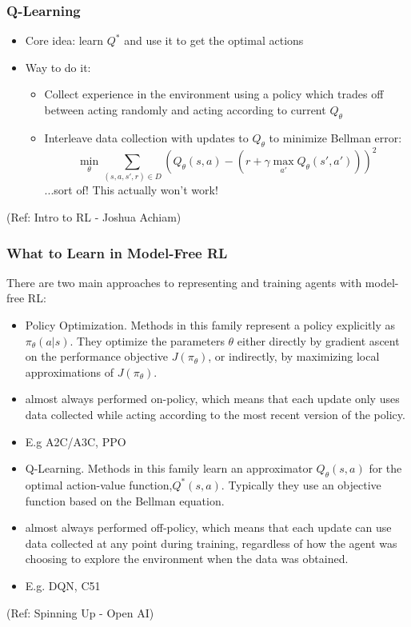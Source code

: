\begin{frame}[fragile]\frametitle{Q-Learning}

\begin{itemize}
\item Core idea: learn $Q^*$ and use it to get the optimal actions
\item Way to do it:
\begin{itemize}
\item Collect experience in the environment using a policy which trades off between acting randomly and acting according to current $Q_{\theta}$
\item Interleave data collection with updates to $Q_{\theta}$ to minimize Bellman error:
%
\begin{equation*}
\min_{\theta} \sum_{(s,a,s',r)\in D} \left(Q_{\theta}(s,a) - \left(r + \gamma \max_{a'} Q_{\theta}(s',a') \right) \right)^2
\end{equation*}
...sort of! This actually won't work!
\end{itemize}

\end{itemize}
{\tiny (Ref: Intro to RL - Joshua Achiam)}


\end{frame}


\begin{frame}[fragile]\frametitle{What to Learn in Model-Free RL}

There are two main approaches to representing and training agents with model-free RL:

\begin{itemize}
\item Policy Optimization. Methods in this family represent a policy explicitly as $\pi_{\theta}(a|s)$. They optimize the parameters $\theta$ either directly by gradient ascent on the performance objective $J(\pi_{\theta})$, or indirectly, by maximizing local approximations of $J(\pi_{\theta})$. 
\item  almost always performed on-policy, which means that each update only uses data collected while acting according to the most recent version of the policy.
\item E.g A2C/A3C, PPO
\item Q-Learning. Methods in this family learn an approximator $Q_{\theta}(s,a)$ for the optimal action-value function,$ Q^*(s,a)$. Typically they use an objective function based on the Bellman equation.
\item almost always performed off-policy, which means that each update can use data collected at any point during training, regardless of how the agent was choosing to explore the environment when the data was obtained. 
\item E.g. DQN, C51
\end{itemize}

{\tiny (Ref: Spinning Up - Open AI)}
\end{frame}

